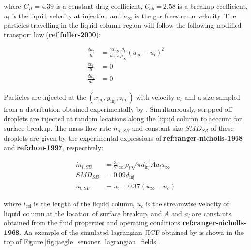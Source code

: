 where $C_D = 4.39$ is a constant drag coefficient, $C_{ab} = 2.58$ is a breakup coefficient, $u_l$ is the liquid velocity at injection and $u_\infty$ is the gas freestream velocity. The particles travelling in the liquid column region will follow the following modified transport law (\textbf{ref:fuller-2000}):

\begin{subequations}
\label{eq:momentum_jaegle_model}
\begin{align}
\frac{d u_l}{d t} &= \frac{2 C_D}{d_\mathrm{inj} \pi} \frac{\rho_l}{\rho_\infty} \left( u_\infty - u_l \right)^2  \\
\frac{d v_l}{d t} &= 0 \\
\frac{d w_l}{d t} &= 0 
\end{align}
\end{subequations}

Particles are injected at the $\left( x_\mathrm{inj}, y_\mathrm{inj}, z_\mathrm{inj} \right)$ with  velocity $u_l$ and a size sampled from a distribution obtained experimentally by . Simultaneously, stripped-off droplets are injected at random locations along the liquid column to account for surface breakup. The mass flow rate $\dot{m}_{l,SB}$ and constant size $SMD_{SB}$ of these droplets are given by the experimental expressions of \textbf{ref:ranger-nicholls-1968} and \textbf{ref:chou-1997}, respectively:

\begin{subequations}
\label{eq:surface_breakup_jaegle_model}
\begin{align}
\dot{m}_{l,SB} &= \frac{3}{2} l_\mathrm{col} \rho_l \sqrt{\pi d_\mathrm{inj}} A a_l u_\infty \\
SMD_{SB} &= 0.09 d_\mathrm{inj} \\
u_{l,SB} &= u_c + 0.37 \left( u_\infty - u_c \right)
\end{align}
\end{subequations}

where $l_\mathrm{col}$ is the length of the liquid column, $u_c$ is the streamwise velocity of liquid column at the location of surface breakup, and $A$ and $a_l$ are constants obtained from the fluid properties and operating conditions \textbf{ref:ranger-nicholls-1968}. An example of the simulated lagrangian JICF obtained by  is shown in the top of Figure \ref{fig:jaegle_senoner_lagrangian_fields}.

